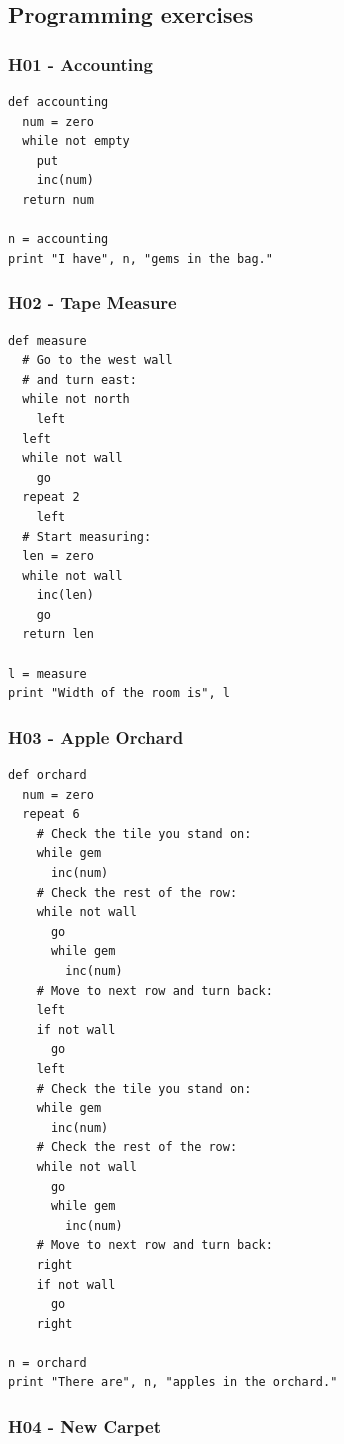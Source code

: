 \documentclass[article,A4,12pt]{llncs}
\begin{document}
\subsection{Programming exercises}

\subsubsection{H01 - Accounting}

\begin{verbatim}
def accounting
  num = zero
  while not empty
    put
    inc(num)
  return num

n = accounting
print "I have", n, "gems in the bag."
\end{verbatim}


\subsubsection{H02 - Tape Measure}

\begin{verbatim}
def measure
  # Go to the west wall
  # and turn east:
  while not north
    left
  left
  while not wall
    go
  repeat 2
    left
  # Start measuring:
  len = zero
  while not wall
    inc(len)
    go
  return len
  
l = measure
print "Width of the room is", l
\end{verbatim}


\subsubsection{H03 - Apple Orchard}

\begin{verbatim}
def orchard
  num = zero
  repeat 6
    # Check the tile you stand on:
    while gem
      inc(num)
    # Check the rest of the row:
    while not wall
      go
      while gem
        inc(num)
    # Move to next row and turn back:
    left
    if not wall
      go
    left
    # Check the tile you stand on:
    while gem
      inc(num)
    # Check the rest of the row:
    while not wall
      go
      while gem
        inc(num)
    # Move to next row and turn back:
    right
    if not wall
      go
    right

n = orchard
print "There are", n, "apples in the orchard."
\end{verbatim}


\subsubsection{H04 - New Carpet}
\end{document}
